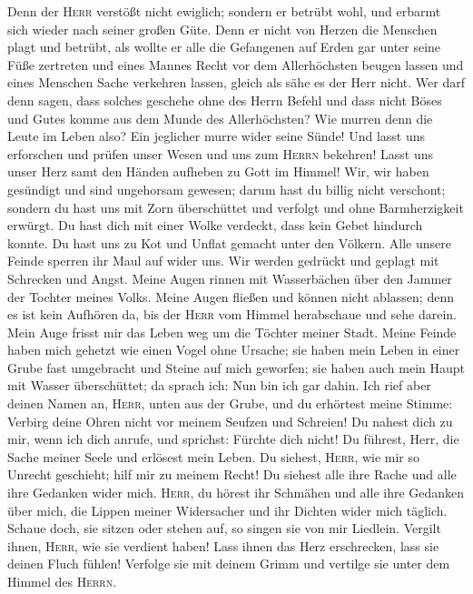 Denn der \textsc{Herr} verstößt nicht ewiglich;  sondern
er betrübt wohl, und erbarmt sich wieder nach seiner großen Güte.
 Denn er nicht von Herzen die Menschen plagt und betrübt,
 als wollte er alle die Gefangenen auf Erden gar unter
seine Füße zertreten  und eines Mannes Recht vor dem
Allerhöchsten beugen lassen  und eines Menschen Sache
verkehren lassen, gleich als sähe es der Herr nicht.  Wer
darf denn sagen, dass solches geschehe ohne des Herrn Befehl
 und dass nicht Böses und Gutes komme aus dem Munde des
Allerhöchsten?  Wie murren denn die Leute im Leben also?
Ein jeglicher murre wider seine Sünde!  Und lasst uns
erforschen und prüfen unser Wesen und uns zum \textsc{Herrn} bekehren!
 Lasst uns unser Herz samt den Händen aufheben zu Gott im
Himmel!  Wir, wir haben gesündigt und sind ungehorsam
gewesen; darum hast du billig nicht verschont;  sondern
du hast uns mit Zorn überschüttet und verfolgt und ohne Barmherzigkeit
erwürgt.  Du hast dich mit einer Wolke verdeckt, dass
kein Gebet hindurch konnte.  Du hast uns zu Kot und
Unflat gemacht unter den Völkern.  Alle unsere Feinde
sperren ihr Maul auf wider uns.  Wir werden gedrückt und
geplagt mit Schrecken und Angst.  Meine Augen rinnen mit
Wasserbächen über den Jammer der Tochter meines Volks. 
Meine Augen fließen und können nicht ablassen; denn es ist kein Aufhören
da,  bis der \textsc{Herr} vom Himmel herabschaue und
sehe darein.  Mein Auge frisst mir das Leben weg um die
Töchter meiner Stadt.  Meine Feinde haben mich gehetzt
wie einen Vogel ohne Ursache;  sie haben mein Leben in
einer Grube fast umgebracht und Steine auf mich geworfen;
 sie haben auch mein Haupt mit Wasser überschüttet; da
sprach ich: Nun bin ich gar dahin.  Ich rief aber deinen
Namen an, \textsc{Herr}, unten aus der Grube,  und du
erhörtest meine Stimme: Verbirg deine Ohren nicht vor meinem Seufzen und
Schreien!  Du nahest dich zu mir, wenn ich dich anrufe,
und sprichst: Fürchte dich nicht!  Du führest, Herr, die
Sache meiner Seele und erlösest mein Leben.  Du siehest,
\textsc{Herr}, wie mir so Unrecht geschieht; hilf mir zu meinem Recht!
 Du siehest alle ihre Rache und alle ihre Gedanken wider
mich.  \textsc{Herr}, du hörest ihr Schmähen und alle
ihre Gedanken über mich,  die Lippen meiner Widersacher
und ihr Dichten wider mich täglich.  Schaue doch, sie
sitzen oder stehen auf, so singen sie von mir Liedlein. 
Vergilt ihnen, \textsc{Herr}, wie sie verdient haben! 
Lass ihnen das Herz erschrecken, lass sie deinen Fluch fühlen!
 Verfolge sie mit deinem Grimm und vertilge sie unter dem
Himmel des \textsc{Herrn}.

